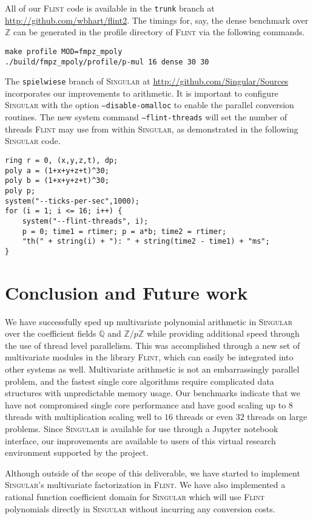 \documentclass{deliverablereport}
\begin{document}
All of our \textsc{Flint} code is available in the {\tt trunk} branch at \url{http://github.com/wbhart/flint2}. The timings for, say, the dense benchmark over $\mathbb{Z}$ can be generated in the profile directory of \textsc{Flint} via the following commands.
\begin{verbatim}
make profile MOD=fmpz_mpoly
./build/fmpz_mpoly/profile/p-mul 16 dense 30 30
\end{verbatim}

The {\tt spielwiese} branch of \textsc{Singular} at \url{http://github.com/Singular/Sources} incorporates our improvements to arithmetic. It is important to configure \textsc{Singular} with the option {\tt --disable-omalloc} to enable the parallel conversion routines. The new system command {\tt --flint-threads} will set the number of threads \textsc{Flint} may use from within \textsc{Singular}, as demonstrated in the following \textsc{Singular} code.
\begin{verbatim}
ring r = 0, (x,y,z,t), dp;
poly a = (1+x+y+z+t)^30;
poly b = (1+x+y+z+t)^30;
poly p;
system("--ticks-per-sec",1000);
for (i = 1; i <= 16; i++) {
    system("--flint-threads", i);
    p = 0; time1 = rtimer; p = a*b; time2 = rtimer;
    "th(" + string(i) + "): " + string(time2 - time1) + "ms";
}
\end{verbatim}


\section{Conclusion and Future work}
We have successfully sped up multivariate polynomial arithmetic in \textsc{Singular} over the coefficient fields $\mathbb{Q}$ and $\mathbb{Z}/p \mathbb{Z}$ while providing additional speed through the use of thread level parallelism. This was accomplished through a new set of multivariate modules in the library \textsc{Flint}, which can easily be integrated into other systems as well. Multivariate arithmetic is not an embarrassingly parallel problem, and the fastest single core algorithms require complicated data structures with unpredictable memory usage. Our benchmarks indicate that we have not compromised single core performance and have good scaling up to $8$ threads with multiplication scaling well to $16$ threads or even $32$ threads on large problems. Since \textsc{Singular} is available for use through a Jupyter notebook interface, our improvements are available to users of this virtual research environment supported by the \ODK project.

Although outside of the scope of this deliverable, we have started to implement \textsc{Singular}'s multivariate factorization in \textsc{Flint}. We have also implemented a rational function coefficient domain for \textsc{Singular} which will use \textsc{Flint} polynomials directly in \textsc{Singular} without incurring any conversion costs.

\printbibliography
\end{document}
